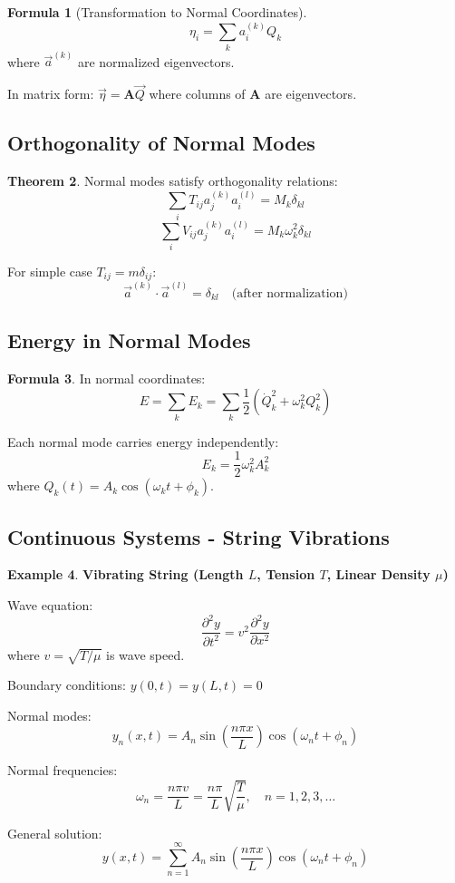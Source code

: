 \documentclass[12pt,a4paper]{article}
\theoremstyle{definition}
\newtheorem{theorem}{Theorem}[section]
\newtheorem{example}[theorem]{Example}
\newtheorem{formula}[theorem]{Formula}
\begin{document}
\begin{formula}[Transformation to Normal Coordinates]
\[
\eta_i = \sum_k a_i^{(k)} Q_k
\]
where $\vec{a}^{(k)}$ are normalized eigenvectors.

In matrix form: $\vec{\eta} = \mathbf{A}\vec{Q}$ where columns of $\mathbf{A}$ are eigenvectors.
\end{formula}

\subsection{Orthogonality of Normal Modes}

\begin{theorem}
Normal modes satisfy orthogonality relations:
\[
\sum_i T_{ij} a_j^{(k)} a_i^{(l)} = M_k\delta_{kl}
\]
\[
\sum_i V_{ij} a_j^{(k)} a_i^{(l)} = M_k\omega_k^2\delta_{kl}
\]

For simple case $T_{ij} = m\delta_{ij}$:
\[
\vec{a}^{(k)} \cdot \vec{a}^{(l)} = \delta_{kl} \quad \text{(after normalization)}
\]
\end{theorem}

\subsection{Energy in Normal Modes}

\begin{formula}
In normal coordinates:
\[
E = \sum_k E_k = \sum_k \frac{1}{2}(\dot{Q}_k^2 + \omega_k^2 Q_k^2)
\]

Each normal mode carries energy independently:
\[
E_k = \frac{1}{2}\omega_k^2 A_k^2
\]
where $Q_k(t) = A_k\cos(\omega_k t + \phi_k)$.
\end{formula}

\subsection{Continuous Systems - String Vibrations}

\begin{example}
\textbf{Vibrating String (Length $L$, Tension $T$, Linear Density $\mu$)}

Wave equation:
\[
\frac{\partial^2 y}{\partial t^2} = v^2 \frac{\partial^2 y}{\partial x^2}
\]
where $v = \sqrt{T/\mu}$ is wave speed.

Boundary conditions: $y(0,t) = y(L,t) = 0$

Normal modes:
\[
y_n(x,t) = A_n\sin\left(\frac{n\pi x}{L}\right)\cos(\omega_n t + \phi_n)
\]

Normal frequencies:
\[
\omega_n = \frac{n\pi v}{L} = \frac{n\pi}{L}\sqrt{\frac{T}{\mu}}, \quad n = 1, 2, 3, \ldots
\]

General solution:
\[
y(x,t) = \sum_{n=1}^{\infty} A_n\sin\left(\frac{n\pi x}{L}\right)\cos(\omega_n t + \phi_n)
\]
\end{example}
\end{document}
